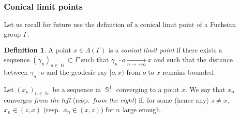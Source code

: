 \documentclass{amsart}
\theoremstyle{plain}
\theoremstyle{definition}
\newtheorem{definition}[proposition]{Definition}
\DeclareMathOperator{\Nb}{{\mathbb{N}}}
\DeclareMathOperator{\Sb}{\mathbb{S}}
\newcommand{\1}{\mathbf{1}}
\begin{document}
\subsubsection{Conical limit points}
Let us recall for future use the definition of a conical limit point of a Fuchsian group $\Gamma$.
\begin{definition}
    A point $x\in \Lambda(\Gamma)$ is a \emph{conical limit point} if there exists a sequence $(\gamma_n)_{n\in \Nb}\subset \Gamma$ such that $\gamma_n\cdot o \underset{n\to +\infty}{\longrightarrow} x$ and such that the distance between $\gamma_n\cdot o$ and the geodesic ray $[o,x)$ from $o$ to $x$ remains bounded.
\end{definition}

Let $(x_n)_{n\in \Nb}$ be a sequence in $\Sb^1$ converging to a point $x$. We say that $x_n$ converges \emph{from the left} (resp.\ \emph{from the right}) if, for some (hence any) $z\neq x$, $x_n \in (z,x)$ (resp.\ $x_n \in (x,z)$) for $n$ large enough.
\end{document}
